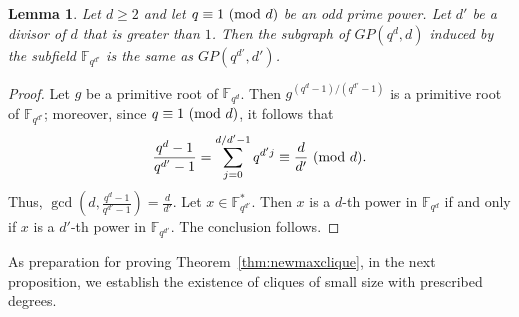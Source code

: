 \documentclass[12pt,reqno]{amsart}
\newtheorem{lem}[thm]{Lemma}
\theoremstyle{definition}
\newcommand{\F}{\mathbb{F}}
\renewcommand{\pmod}[1]{{\ifmmode\text{\rm\ (mod~$#1$)}\else\discretionary{}{}{\hbox{ }}\rm(mod~$#1$)\fi}}
\begin{document}
\begin{lem}\label{lem:subgraph}
Let $d \geq 2$ and let $q \equiv 1 \pmod d$ be an odd prime power. Let $d'$ be a divisor of $d$ that is greater than $1$. Then the subgraph of $GP(q^d,d)$ induced by the subfield $\F_{q^{d'}}$ is the same as $GP(q^{d'},d')$.
\end{lem}
\begin{proof}
Let $g$ be a primitive root of $\F_{q^d}$. Then $g^{(q^d-1)/(q^{d'}-1)}$ is a primitive root of $\F_{q^{d'}}$; moreover, since $q \equiv 1 \pmod d$, it follows that
$$
\frac{q^d-1}{q^{d'}-1}=\sum_{j=0}^{d/d'-1} q^{d'j} \equiv \frac{d}{d'} \pmod d.
$$
Thus, $\gcd(d,\frac{q^d-1}{q^{d'}-1})=\frac{d}{d'}$. Let $x \in \F_{q^{d'}}^*$. Then $x$ is a $d$-th power in $\F_{q^d}$ if and only if $x$ is a $d'$-th power in $\F_{q^{d'}}$. The conclusion follows.
\end{proof}

As preparation for proving Theorem~\ref{thm:newmaxclique}, in the next proposition, we establish the existence of cliques of small size with prescribed degrees.
\end{document}
